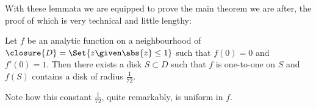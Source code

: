 With these lemmata we are equipped to prove the main theorem we are after, the proof of which is very technical and little lengthy:

\begin{theorem}\label{thm9.4}
	Let $f$ be an analytic function on a neighbourhood of $\closure{D} = \Set{z \given \abs{z} \leq 1}$ such that $f(0) = 0$ and $f'(0) = 1$.
	Then there exists a disk $S \subset D$ such that $f$ is one-to-one on $S$ and $f(S)$ contains a disk of radius $\frac{1}{72}$.
\end{theorem}

\begin{remark}
	Note how this constant $\frac{1}{72}$, quite remarkably, is uniform in $f$.
\end{remark}
